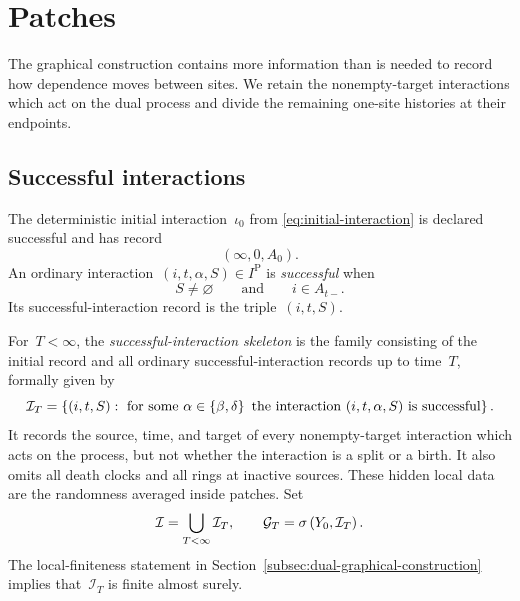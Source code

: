 \section{Patches}
\label{sec:patches}

The graphical construction contains more information than is needed to record
how dependence moves between sites. We retain the nonempty-target interactions
which act on the dual process and divide the remaining one-site histories at
their endpoints.

\subsection{Successful interactions}
\label{subsec:successful-skeleton}

\begin{definition}
\label{def:successful-interaction}
The deterministic initial interaction~$\iota_0$ from
\eqref{eq:initial-interaction} is declared successful and has record
\begin{equation*}
(\infty,0,A_0).
\end{equation*}
An ordinary interaction~$(i,t,\alpha,S)\in I^{\mathrm P}$ is
\emph{successful} when
\begin{equation*}
S\neq\varnothing
\qquad\text{and}\qquad
i\in A_{t-}.
\end{equation*}
Its successful-interaction record is the triple~$(i,t,S)$.
\end{definition}

For~$T<\infty$, the \emph{successful-interaction skeleton} is
the family consisting of the initial record and all ordinary
successful-interaction records up to time~$T$, formally given by
\begin{equation*}
\mathcal I_T = \left\{(i,t,S) : \text{ for some }\alpha\in\left\{\beta,\delta\right\} \text{ the interaction } (i,t,\alpha,S) \text{ is successful}\right\}.
\end{equation*}
It records the source, time, and
target of every nonempty-target interaction which acts on the process, but not
whether the interaction is a split or a birth. It also omits all death clocks
and all rings at inactive sources. These hidden local data are the randomness
averaged inside patches. Set
\begin{equation*}
\mathcal I=\bigcup_{T<\infty}\mathcal I_T,
\qquad
\mathcal G_T=\sigma\left(Y_0,\mathcal I_T\right).
\end{equation*}
The local-finiteness statement in
Section~\ref{subsec:dual-graphical-construction} implies that~$\mathcal I_T$ is
finite almost surely.

